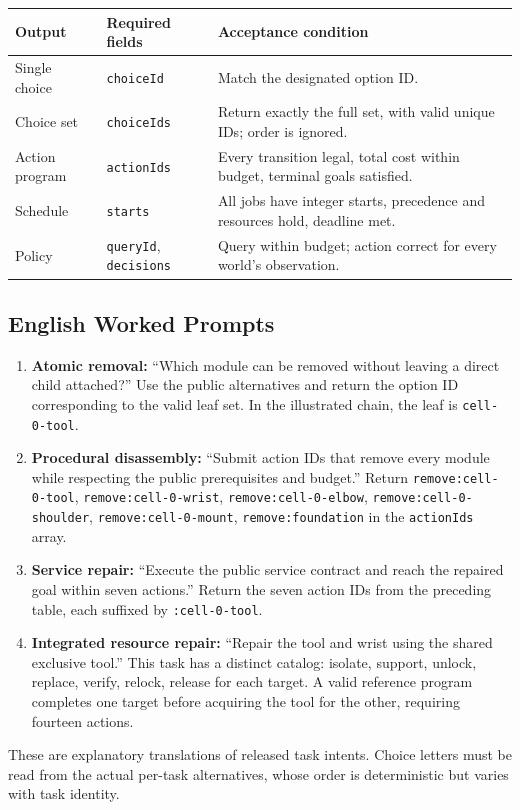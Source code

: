 \begin{center}\small
\begin{tabularx}{\textwidth}{llX}
\toprule Output & Required fields & Acceptance condition\\\midrule
Single choice & \texttt{choiceId} & Match the designated option ID.\\
Choice set & \texttt{choiceIds} & Return exactly the full set, with valid unique IDs; order is ignored.\\
Action program & \texttt{actionIds} & Every transition legal, total cost within budget, terminal goals satisfied.\\
Schedule & \texttt{starts} & All jobs have integer starts, precedence and resources hold, deadline met.\\
Policy & \texttt{queryId}, \texttt{decisions} & Query within budget; action correct for every world's observation.\\
\bottomrule
\end{tabularx}
\end{center}

\subsection{English Worked Prompts}
\begin{enumerate}
\item \textbf{Atomic removal:} ``Which module can be removed without
leaving a direct child attached?'' Use the public alternatives and
return the option ID corresponding to the valid leaf set. In the
illustrated chain, the leaf is \texttt{cell-0-tool}.
\item \textbf{Procedural disassembly:} ``Submit action IDs that remove
every module while respecting the public prerequisites and budget.''
Return \texttt{remove:cell-0-tool}, \texttt{remove:cell-0-wrist},
\texttt{remove:cell-0-elbow}, \texttt{remove:cell-0-shoulder},
\texttt{remove:cell-0-mount}, \texttt{remove:foundation} in the
\texttt{actionIds} array.
\item \textbf{Service repair:} ``Execute the public service contract
and reach the repaired goal within seven actions.'' Return the seven
action IDs from the preceding table, each suffixed by
\texttt{:cell-0-tool}.
\item \textbf{Integrated resource repair:} ``Repair the tool and wrist
using the shared exclusive tool.'' This task has a distinct catalog:
isolate, support, unlock, replace, verify, relock, release for each
target. A valid reference program completes one target before
acquiring the tool for the other, requiring fourteen actions.
\end{enumerate}
These are explanatory translations of released task intents. Choice
letters must be read from the actual per-task alternatives, whose order
is deterministic but varies with task identity.

